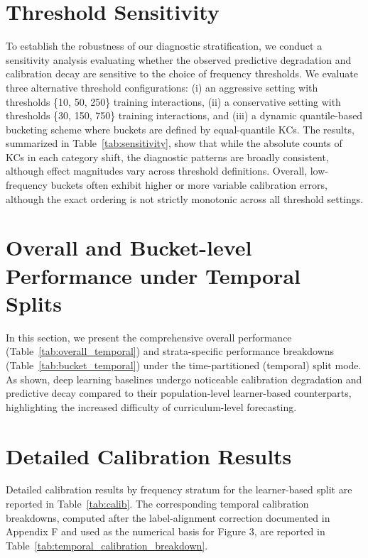 \section{Threshold Sensitivity}
\label{app:sensitivity}
To establish the robustness of our diagnostic stratification, we conduct a sensitivity analysis evaluating whether the observed predictive degradation and calibration decay are sensitive to the choice of frequency thresholds. We evaluate three alternative threshold configurations: (i) an aggressive setting with thresholds \{10, 50, 250\} training interactions, (ii) a conservative setting with thresholds \{30, 150, 750\} training interactions, and (iii) a dynamic quantile-based bucketing scheme where buckets are defined by equal-quantile KCs. The results, summarized in Table~\ref{tab:sensitivity}, show that while the absolute counts of KCs in each category shift, the diagnostic patterns are broadly consistent, although effect magnitudes vary across threshold definitions. Overall, low-frequency buckets often exhibit higher or more variable calibration errors, although the exact ordering is not strictly monotonic across all threshold settings.


\FloatBarrier

\section{Overall and Bucket-level Performance under Temporal Splits}
\label{app:temporal_performance}
In this section, we present the comprehensive overall performance (Table~\ref{tab:overall_temporal}) and strata-specific performance breakdowns (Table~\ref{tab:bucket_temporal}) under the time-partitioned (temporal) split mode. As shown, deep learning baselines undergo noticeable calibration degradation and predictive decay compared to their population-level learner-based counterparts, highlighting the increased difficulty of curriculum-level forecasting.




\clearpage
\section{Detailed Calibration Results}
\label{app:calibration_performance}
Detailed calibration results by frequency stratum for the learner-based split are reported in Table~\ref{tab:calib}. The corresponding temporal calibration breakdowns, computed after the label-alignment correction documented in Appendix F and used as the numerical basis for Figure 3, are reported in Table~\ref{tab:temporal_calibration_breakdown}.

